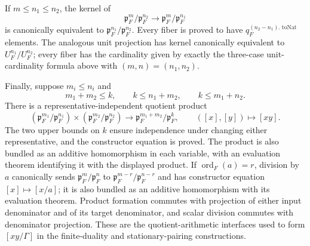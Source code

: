 \begin{definition}
If $m\leq n_1\leq n_2$, the kernel of
\[
 \mathfrak p_F^m/\mathfrak p_F^{n_2}\longrightarrow
 \mathfrak p_F^m/\mathfrak p_F^{n_1}
\]
is canonically equivalent to
$\mathfrak p_F^{n_1}/\mathfrak p_F^{n_2}$.  Every fiber is proved to have
$q_F^{(n_2-n_1).\operatorname{toNat}}$ elements.  The analogous unit
projection has kernel canonically equivalent to $U_F^{n_1}/U_F^{n_2}$;
every fiber has the cardinality given by exactly the
three-case unit-cardinality formula above with $(m,n)=(n_1,n_2)$.

Finally, suppose $m_i\leq n_i$ and
\[
 m_1+m_2\leq k,\qquad
 k\leq n_1+m_2,\qquad k\leq m_1+n_2.
\]
There is a representative-independent quotient product
\[
 (\mathfrak p_F^{m_1}/\mathfrak p_F^{n_1})\times
 (\mathfrak p_F^{m_2}/\mathfrak p_F^{n_2})
 \longrightarrow
 \mathfrak p_F^{m_1+m_2}/\mathfrak p_F^k,
 \qquad ([x],[y])\longmapsto[xy].
\]
The two upper bounds on $k$ ensure independence under changing either
representative, and the constructor equation is proved.  The product is
also bundled as an additive homomorphism in each variable, with an
evaluation theorem identifying it with the displayed product.  If
$\operatorname{ord}_F(a)=r$, division by $a$ canonically sends
$\mathfrak p_F^m/\mathfrak p_F^n$ to
$\mathfrak p_F^{m-r}/\mathfrak p_F^{n-r}$ and has constructor equation
$[x]\mapsto[x/a]$; it is also bundled as an additive homomorphism with its
evaluation theorem.  Product formation commutes with projection of either
input denominator and of its target denominator, and scalar division
commutes with denominator projection.  These are the quotient-arithmetic interfaces used to form
$[xy/\Gamma]$ in the finite-duality and stationary-pairing constructions.


\end{definition}
